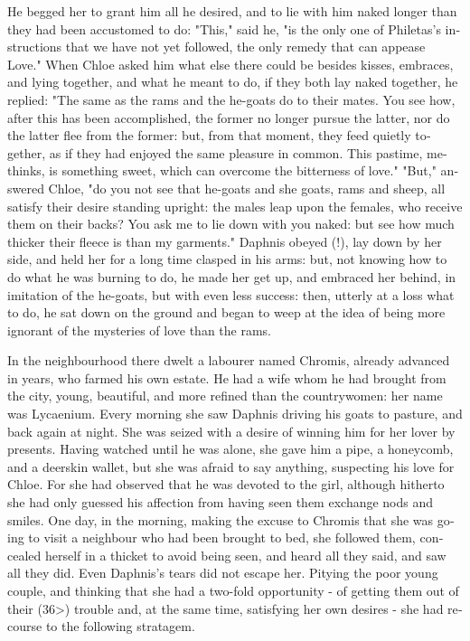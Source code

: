 \documentclass{book}
\begin{document}
\begin{pairs}
\begin{Rightside}
\begin{english}
  He begged her to grant him all he desired, and to lie with him naked longer than they had been accustomed to do: "This," said he, "is the only one of Philetas's instructions that we have not yet followed, the only remedy that can appease Love."  When Chloe asked him what else there could be besides kisses, embraces, and lying together, and what he meant to do, if they both lay naked together, he replied: "The same as the rams and the he-goats do to their mates.  You see how, after this has been accomplished, the former no longer pursue the latter, nor do the latter flee from the former: but, from that moment, they feed quietly together, as if they had enjoyed the same pleasure in common.  This pastime, methinks, is something sweet, which can overcome the bitterness of love."  "But," answered Chloe, "do you not see that he-goats and she goats, rams and sheep, all satisfy their desire standing upright: the males leap upon the females, who receive them on their backs?  You ask me to lie down with you naked: but see how much thicker their fleece is than my garments."  Daphnis obeyed (!), lay down by her side, and held her for a long time clasped in his arms: but, not knowing how to do what he was burning to do, he made her get up, and embraced her behind, in imitation of the he-goats, but with even less success: then, utterly at a loss what to do, he sat down on the ground and began to weep at the idea of being more ignorant of the mysteries of love than the rams.
\pend


  In the neighbourhood there dwelt a labourer named Chromis, already advanced in years, who farmed his own estate.  He had a wife whom he had brought from the city, young, beautiful, and more refined than the countrywomen: her name was Lycaenium.  Every morning she saw Daphnis driving his goats to pasture, and back again at night.  She was seized with a desire of winning him for her lover by presents.  Having watched until he was alone, she gave him a pipe, a honeycomb, and a deerskin wallet, but she was afraid to say anything, suspecting his love for Chloe.  For she had observed that he was devoted to the girl, although hitherto she had only guessed his affection from having seen them exchange nods and smiles.  One day, in the morning, making the excuse to Chromis that she was going to visit a neighbour who had been brought to bed, she followed them, concealed herself in a thicket to avoid being seen, and heard all they said, and saw all they did.  Even Daphnis's tears did not escape her.  Pitying the poor young couple, and thinking that she had a two-fold opportunity - of getting them out of their (36>) trouble and, at the same time, satisfying her own desires - she had recourse to the following stratagem.
\pend



\end{english}
\end{Rightside}
\end{pairs}
\end{document}
